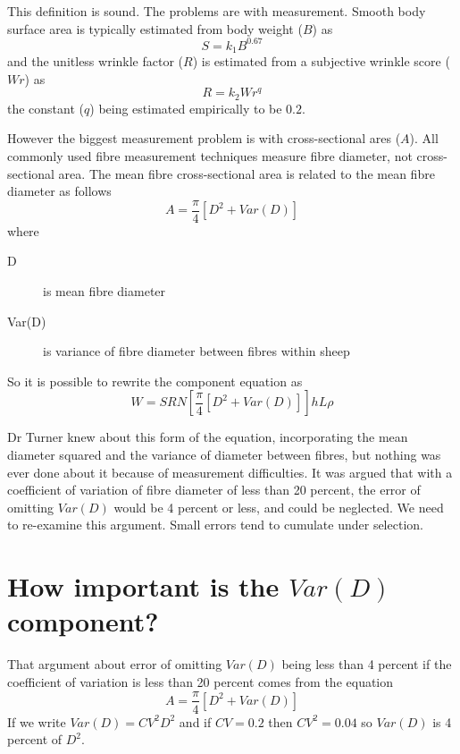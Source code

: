 \documentclass[titlepage]{article}  %
\begin{document}
This definition is sound. The problems are with measurement. Smooth body surface area is typically estimated from body weight ($B$) as
\begin{displaymath}
S = k_{1} B^{0.67}
\end{displaymath}
and the unitless wrinkle factor ($R$) is estimated from a subjective wrinkle score ($Wr$) as
\begin{displaymath}
R = k_{2} Wr^{q}
\end{displaymath}
the constant ($q$) being estimated empirically to be $0.2$.

However the biggest measurement problem is with cross-sectional ares ($A$). All commonly used fibre measurement techniques measure fibre diameter, not cross-sectional area.  The mean fibre cross-sectional area is related to the mean fibre diameter as follows
\begin{displaymath}
A = \frac{\pi}{4}[D^{2} + Var{(D)}]
\end{displaymath}
where 
\begin{description}
\item[D] is mean fibre diameter
\item[Var{(D)}] is variance of fibre diameter between fibres within sheep
\end{description}

So it is possible to rewrite the component equation as
\begin{displaymath}
W = S R N \left[ \frac{\pi}{4}[D^{2} + Var{(D)}]\right] hL \rho
\end{displaymath}

Dr Turner knew about this form of the equation, incorporating the mean diameter squared and the variance of diameter between fibres, but nothing was ever done about it because of measurement difficulties. It was argued that with a coefficient of variation of fibre diameter of less than 20 percent, the error of omitting $Var{(D)}$ would be 4 percent or less, and could be neglected.  We need to re-examine this argument. Small errors tend to cumulate under selection.

\section{How important is the $Var{(D)}$ component?}
That argument about error of omitting $Var{(D)}$ being less than 4 percent if the coefficient of variation is less than 20 percent comes from the equation
\begin{displaymath}
A = \frac{\pi}{4}[D^{2} + Var{(D)}]
\end{displaymath}
If we write $Var{(D)} = CV^{2} D^{2}$ and if $CV=0.2$ then $CV^{2} = 0.04$ so $Var{(D)}$ is 4 percent of $D^{2}$. 
\end{document}
